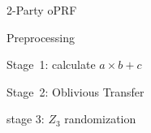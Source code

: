 \begin{algorithm}
	\caption{2-Party oPRF}
	\begin{algorithmic}
		
		\STATE Preprocessing
		
		\STATE Stage\ 1: calculate $a \times b \plus c$
		
		\STATE Stage\ 2: Oblivious Transfer
		
		\STATE stage 3: $Z_3$ randomization  
		
	\end{algorithmic}
\end{algorithm}

\fi






